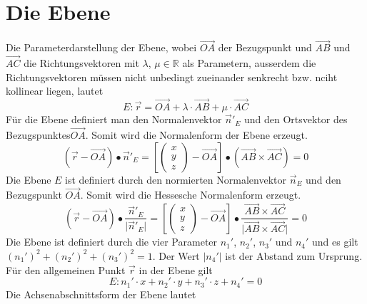 \section{Die Ebene}
Die Parameterdarstellung der Ebene, wobei $\overrightarrow{OA}$ der Bezugspunkt und $\overrightarrow{AB}$ und $\overrightarrow{AC}$ die Richtungsvektoren mit $\lambda$, $\mu\in\mathbb{R}$ als Parametern, ausserdem die Richtungsvektoren müssen nicht unbedingt zueinander senkrecht bzw. nciht kollinear liegen, lautet
\begin{equation}
\boxed{E:\overrightarrow{r}=\overrightarrow{OA}+\lambda\cdot \overrightarrow{AB}+\mu\cdot \overrightarrow{AC}}
\end{equation}
Für die Ebene definiert man den Normalenvektor $\overrightarrow{n}'_E$ und den Ortsvektor des Bezugspunktes$\overrightarrow{OA}$. Somit wird die Normalenform der Ebene erzeugt.
\begin{equation}
\boxed{\left(\overrightarrow{r}-\overrightarrow{OA}\right)\bullet\overrightarrow{n}'_E=\left[\begin{pmatrix}x\\y\\z\end{pmatrix}-\overrightarrow{OA}\right]\bullet \left(\overrightarrow{AB}\times \overrightarrow{AC}\right)=0}
\end{equation}
Die Ebene $E$ ist definiert durch den normierten Normalenvektor $\overrightarrow{n}_E$ und den Bezugspunkt $\overrightarrow{OA}$. Somit wird die Hessesche Normalenform erzeugt.
\begin{equation}
\boxed{\left(\overrightarrow{r}-\overrightarrow{OA}\right)\bullet \dfrac{\overrightarrow{n}'_E}{\Big\vert \overrightarrow{n}'_E\Big\vert}=\left[\begin{pmatrix}x\\y\\z\end{pmatrix}-\overrightarrow{OA}\right]\bullet \dfrac{\overrightarrow{AB}\times \overrightarrow{AC}}{\Big\vert\overrightarrow{AB}\times \overrightarrow{AC}\Big\vert}=0}
\end{equation}
Die Ebene ist definiert durch die vier Parameter $n_1'$, $n_2'$, $n_3'$ und $n_4'$ und es gilt $(n_1')^2+(n_2')^2+(n_3')^2=1$. Der Wert $\vert n_4'\vert$ ist der Abstand zum Ursprung. Für den allgemeinen Punkt $\overrightarrow{r}$ in der Ebene gilt
\begin{equation}
\boxed{E:n_1'\cdot x+n_2'\cdot y+n_3'\cdot z+n_4'=0}
\end{equation}
Die Achsenabschnittsform der Ebene lautet
